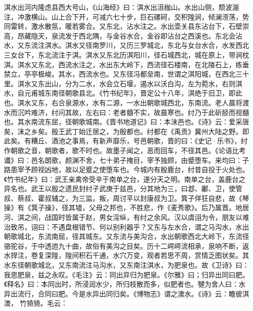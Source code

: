 \documentclass[12pt,UTF8]{ctexbook}
\begin{document}
淇水出河内隆虑县西大号山，《山海经》曰：淇水出沮枷山。水出山侧，颓波漰注，冲激横山。山上合下开，可减六七十步，巨石磥砢，交积隍涧，倾澜涝荡，势同雷转，激水散氛，暖若雾合。又东北，沾水注之。水出壶关县东沾台下，石壁崇高，昂藏隐天，泉流发于西北隅，与金谷水合，金谷即沾台之西溪也。东北会沾水，又东流注淇水。淇水又径南罗川，又历三罗城北，东北与女台水合，水发西北三女台下，东北流注于淇。淇水又东北历淇阳川，径石城西北，城在原上，带涧枕淇。淇水又东北，西流水注之，水出东大岭下，西流径石楼南，在北陵石上，练垂禁立，亭亭极峻。其水，西流水也。又东径冯都垒南，世谓之淇阳城，在西北三十里。淇水又东出山，分为二水，水会立石堰，遏水以沃白沟，左为菀水，右则淇水，自元甫城东南径朝歌县北。《竹书纪年》，晋定公十八年，淇绝于旧卫，即此也。淇水又东，右合泉源水，水有二源，一水出朝歌城西北，东南流。老人晨将渡水而沉吟难济，纣问其故，左右曰：老者髓不实，故晨寒也。纣乃于此斫胫而视髓也。其水南流东屈，径朝歌城南。《晋书地道记》曰：本沫邑也。《诗》云：爱采唐矣，沫之乡矣。殷王武丁始迁居之，为殷都也。纣都在《禹贡》冀州大陆之野。即此矣。有糟丘、酒池之事焉，有新声靡乐，号邑朝歌，晋的曰：《史记·乐书》，纣作朝歌之音，朝歌者，歌不时也。故墨子闻之，恶而回车，不径其邑。《论语比考谶》曰：邑名朗歌，颜渊不舍，七十弟子掩目，宰予独顾，由蹙堕车。来均曰：子路患宰予顾视凶地，故以足蹙之使堕车也。今城内有殷鹿台，纣昔自投于火处也。《竹书纪年》曰：武王亲禽帝受辛于南单之台，遂分天之明。南单之台，盖鹿台之异名也。武王以殷之遗民封纣子武庚于兹邑，分其地为三，曰邶、鄘、卫，使管叔、蔡叔、霍叔辅之，为三监。叛，周讨平以封康叔为卫。箕子佯狂自悲，故《琴操》有《箕子操》，径其墟，父母之邦也，不胜悲，作《麦秀歌》。后乃属晋。地居河、淇之间，战国时皆属于赵，男女淫纵，有纣之余风。汉以虞诩为令，朋友以难治致吊，诩曰：不遇盘根错节、何以别利器乎？又东与左水合，谓之马沟水，水出朝歌城北，东流南屈，径其城东。又东流与美沟合，水出朝歌西北大岭下，东流径骆驼谷，于中透迆九十曲，故俗有美沟之目矣。历十二崿崿流相承，泉响不断，返水捍注，卷复深隍，隍间积石千通，水穴万变，观者若思不周，赏情乏图状矣。其水东径朝歌城北，又东南流注马沟水，又东南注淇水，为肥泉也。故《卫诗》曰：我思肥泉，兹之永叹。《毛注》云：同出异归为肥泉。《尔雅》曰；归异出同曰肥。《释名》曰：本同出时，所浸润水少，所归枝散而多，似肥者也。犍为舍人曰：水异出流行，合同曰肥。今是水异出同归矣。《博物志》谓之澳水。《诗》云：瞻彼淇澳， 竹猗猗。毛云： 
\end{document}

